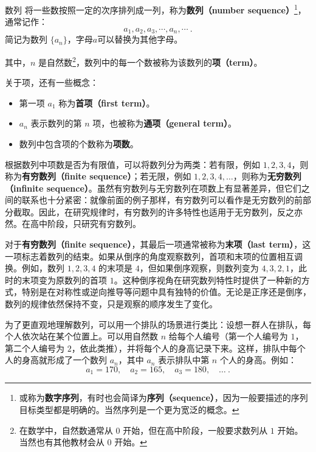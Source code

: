 \begin{definition}{数列}
将一些数按照一定的次序排列成一列，称为\textbf{数列（number sequence）}\footnote{或称为\textbf{数字序列}，有时也会简译为\textbf{序列（sequence）}，因为一般要描述的序列目标类型都是明确的。当然序列是一个更为宽泛的概念。}，通常记作：
\begin{equation}
a_1, a_2, a_3, \cdots, a_n, \cdots~.
\end{equation}
简记为数列 $\{a_n\}$，字母$a$可以替换为其他字母。

其中，$n$ 是自然数\footnote{在数学中，自然数通常从 $0$ 开始，但在高中阶段，一般要求数列从 $1$ 开始。当然也有其他教材会从 $0$ 开始。}，数列中的每一个数被称为该数列的\textbf{项（term）}。
\end{definition}

关于项，还有一些概念：
\begin{itemize}
\item 第一项 $a_1$ 称为\textbf{首项（first term）}。 
\item $a_n$ 表示数列的第 $n$ 项，也被称为\textbf{通项（general term）}。
\item 数列中包含项的个数称为\textbf{项数}。
\end{itemize}

根据数列中项数是否为有限值，可以将数列分为两类：若有限，例如 $1, 2, 3, 4$，则称为\textbf{有穷数列（finite sequence）}；若无限，例如 $1, 2, 3, 4, \dots$，则称为\textbf{无穷数列（infinite sequence）}。虽然有穷数列与无穷数列在项数上有显著差异，但它们之间的联系也十分紧密：就像前面的例子那样，有穷数列可以看作是无穷数列的前部分截取。因此，在研究规律时，有穷数列的许多特性也适用于无穷数列，反之亦然。在高中阶段，只研究有穷数列。

对于\textbf{有穷数列（finite sequence）}，其最后一项通常被称为\textbf{末项（last term）}，这一项标志着数列的结束。如果从倒序的角度观察数列，首项和末项的位置相互调换。例如，数列 $1, 2, 3, 4$ 的末项是 $4$，但如果倒序观察，则数列变为 $4, 3, 2, 1$，此时的末项变为原数列的首项 $1$。这种倒序视角在研究数列特性时提供了一种新的方式，特别是在对称性或逆向推导等问题中具有独特的价值。无论是正序还是倒序，数列的规律依然保持不变，只是观察的顺序发生了变化。

为了更直观地理解数列，可以用一个排队的场景进行类比：设想一群人在排队，每个人依次站在某个位置上。可以用自然数 $n$ 给每个人编号（第一个人编号为 $1$，第二个人编号为 $2$，依此类推），并将每个人的身高记录下来。这样，排队中每个人的身高就形成了一个数列 ${a_n}$，其中 $a_n$ 表示排队中第 $n$ 个人的身高。例如：
\begin{equation}
a_1 = 170, \quad a_2 = 165, \quad a_3 = 180, \quad \dots~.
\end{equation}

